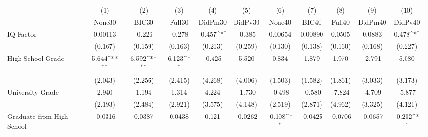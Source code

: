 {
\def\sym#1{\ifmmode^{#1}\else\(^{#1}\)\fi}
\begin{tabular}{l*{10}{c}}
\toprule
            &\multicolumn{1}{c}{(1)}&\multicolumn{1}{c}{(2)}&\multicolumn{1}{c}{(3)}&\multicolumn{1}{c}{(4)}&\multicolumn{1}{c}{(5)}&\multicolumn{1}{c}{(6)}&\multicolumn{1}{c}{(7)}&\multicolumn{1}{c}{(8)}&\multicolumn{1}{c}{(9)}&\multicolumn{1}{c}{(10)}\\
            &\multicolumn{1}{c}{None30}&\multicolumn{1}{c}{BIC30}&\multicolumn{1}{c}{Full30}&\multicolumn{1}{c}{DidPm30}&\multicolumn{1}{c}{DidPv30}&\multicolumn{1}{c}{None40}&\multicolumn{1}{c}{BIC40}&\multicolumn{1}{c}{Full40}&\multicolumn{1}{c}{DidPm40}&\multicolumn{1}{c}{DidPv40}\\
\midrule
IQ Factor   &     0.00113         &      -0.226         &      -0.278         &      -0.457\sym{*}  &      -0.385         &     0.00654         &     0.00890         &      0.0505         &      0.0883         &       0.478\sym{*}  \\
            &     (0.167)         &     (0.159)         &     (0.163)         &     (0.213)         &     (0.259)         &     (0.130)         &     (0.138)         &     (0.160)         &     (0.168)         &     (0.227)         \\
\addlinespace
High School Grade&       5.644\sym{**} &       6.592\sym{**} &       6.123\sym{*}  &      -0.425         &       5.520         &       0.834         &       1.879         &       1.970         &      -2.791         &       5.080         \\
            &     (2.043)         &     (2.256)         &     (2.415)         &     (4.268)         &     (4.006)         &     (1.503)         &     (1.582)         &     (1.861)         &     (3.033)         &     (3.173)         \\
\addlinespace
University Grade&       2.940         &       1.194         &       1.314         &       4.224         &      -1.730         &      -0.498         &      -0.580         &      -7.824         &      -4.709         &      -5.877         \\
            &     (2.193)         &     (2.484)         &     (2.921)         &     (3.575)         &     (4.148)         &     (2.519)         &     (2.871)         &     (4.962)         &     (3.325)         &     (4.121)         \\
\addlinespace
Graduate from High School&     -0.0316         &      0.0387         &      0.0438         &       0.121         &     -0.0262         &      -0.108\sym{*}  &     -0.0425         &     -0.0706         &     -0.0657         &      -0.202\sym{*}  \\

\end{tabular}}
